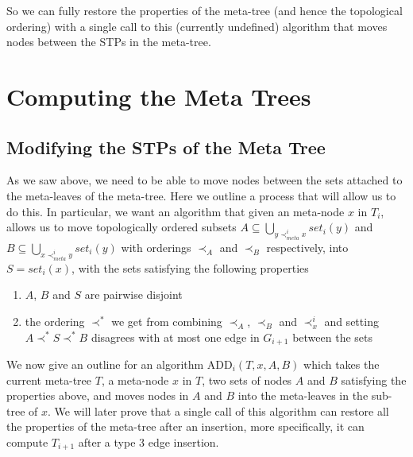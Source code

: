 \documentclass{article}
\begin{document}
So we can fully restore the properties of the meta-tree (and hence the topological ordering) with a single call to this (currently undefined) algorithm that moves nodes between the STPs in the meta-tree.

\section{Computing the Meta Trees}

\subsection{Modifying the STPs of the Meta Tree}

As we saw above, we need to be able to move nodes between the sets attached to the meta-leaves of the meta-tree. Here we outline a process that will allow us to do this. In particular, we want an algorithm that given an meta-node $x$ in $T_{i}$, allows us to move topologically ordered subsets $A \subseteq \bigcup_{y \prec_{meta}^{i} x} set_{i}(y)$ and $B \subseteq \bigcup_{x \prec_{meta}^{i} y} set_{i}(y)$ with orderings $\prec_{A}$ and $\prec_{B}$ respectively, into $S=set_{i}(x)$, with the sets satisfying the following properties

\begin{enumerate}
\item $A$, $B$ and $S$ are pairwise disjoint
\item the ordering $\prec^{*}$ we get from combining $\prec_{A}$, $\prec_{B}$ and $\prec_{x}^{i}$ and setting $A \prec^{*} S \prec^{*} B$ disagrees with at most one edge in $G_{i+1}$ between the sets
\end{enumerate}

We now give an outline for an algorithm ADD$_{i}(T,x,A,B)$ which takes the current meta-tree $T$, a meta-node $x$ in $T$, two sets of nodes $A$ and $B$ satisfying the properties above, and moves nodes in $A$ and $B$ into the meta-leaves in the sub-tree of $x$. We will later prove that a single call of this algorithm can restore all the properties of the meta-tree after an insertion, more specifically, it can compute $T_{i+1}$ after a type 3 edge insertion.
\end{document}
